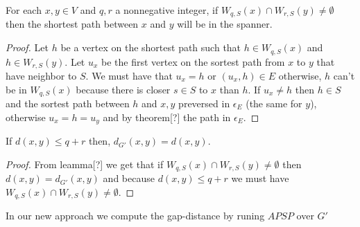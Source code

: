 \begin{lemma} 
For each  $x,y \in V$ and $q,r$ a nonnegative integer, if $W_{q,S}(x)\cap W_{r,S}(y) \not = \emptyset$ then the shortest path between $x$ and $y$ will be in the spanner. 
\end{lemma}

\begin{proof}
 Let $h$ be a vertex on the shortest path such that $h\in W_{q,S}(x)$ and $h\in W_{r,S}(y)$. \breakline
Let $u_x$ be the first vertex on the sortest path from $x$ to $y$ that have neighbor to $S$. We must have that $u_x=h$ or $(u_x,h)\in E$ otherwise, $h$ can't be in $W_{q,S}(x)$ because there is closer $s\in S$ to $x$ than $h$. If $u_x \not = h$ then $h\in S$ and the sortest path between $h$ and $x,y$ preversed in $\epsilon_E$ (the same for $y$), otherwise $u_x=h=u_y$ and by theorem[?] the path in $\epsilon_E$. 
\end{proof}


\begin{lemma}
If $d(x,y)\leq q+r$ then, $d_{G'}(x,y)=d(x,y)$.
\end{lemma}

\begin{proof}
From leamma[?] we get that if $W_{q,S}(x)\cap W_{r,S}(y) \not = \emptyset$ then $d(x,y)=d_{G'}(x,y)$ and because $d(x,y)\leq q+r$ we must have $W_{q,S}(x)\cap W_{r,S}(y) \not = \emptyset$.
\end{proof}

\breakline
In our new approach we compute the gap-distance by runing $APSP$ over $G'$ 